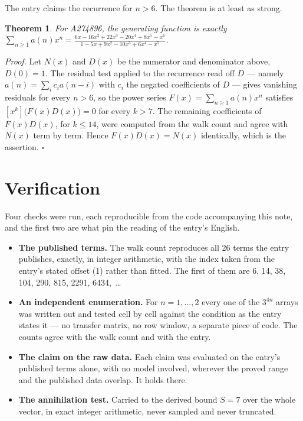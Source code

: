 \documentclass[11pt]{article}
\newtheorem{theorem}{Theorem}
\theoremstyle{definition}
\begin{document}
The entry claims the recurrence for $n > 6$. The theorem is at least as strong.

\begin{theorem} For A274896, the generating function is exactly $\sum_{n\ge 1} a(n)x^n = \frac{6x - 16x^{2} + 22x^{3} - 20x^{4} + 8x^{5} - x^{6}}{1 - 5x + 9x^{2} - 10x^{3} + 6x^{4} - x^{5}}$.\end{theorem}

{\itshape Proof.} Let $N(x)$ and $D(x)$ be the numerator and denominator above, $D(0)=1$. The residual test applied to the recurrence read off $D$ --- namely $a(n) = \sum_i c_i a(n-i)$ with $c_i$ the negated coefficients of $D$ --- gives vanishing residuals for every $n > 6$, so the power series $F(x)=\sum_{n\ge 1}a(n)x^n$ satisfies $[x^k]\bigl(F(x)D(x)\bigr) = 0$ for every $k > 7$. The remaining coefficients of $F(x)D(x)$, for $k \le 14$, were computed from the walk count and agree with $N(x)$ term by term. Hence $F(x)D(x) = N(x)$ identically, which is the assertion. $\square$

\section{Verification}

Four checks were run, each reproducible from the code accompanying this note, and the first two are what pin the reading of the entry's English.

\begin{itemize}

\item {\bfseries The published terms.} The walk count reproduces all 26 terms the entry publishes, exactly, in integer arithmetic, with the index taken from the entry's stated offset (1) rather than fitted. The first of them are 6, 14, 38, 104, 290, 815, 2291, 6434,~\dots

\item {\bfseries An independent enumeration.} For $n = 1,\dots,2$ every one of the $3^{4n}$ arrays was written out and tested cell by cell against the condition as the entry states it --- no transfer matrix, no row window, a separate piece of code. The counts agree with the walk count and with the entry.

\item {\bfseries The claim on the raw data.} Each claim was evaluated on the entry's published terms alone, with no model involved, wherever the proved range and the published data overlap. It holds there.

\item {\bfseries The annihilation test.} Carried to the derived bound $S = 7$ over the whole vector, in exact integer arithmetic, never sampled and never truncated.

\end{itemize}
\end{document}
